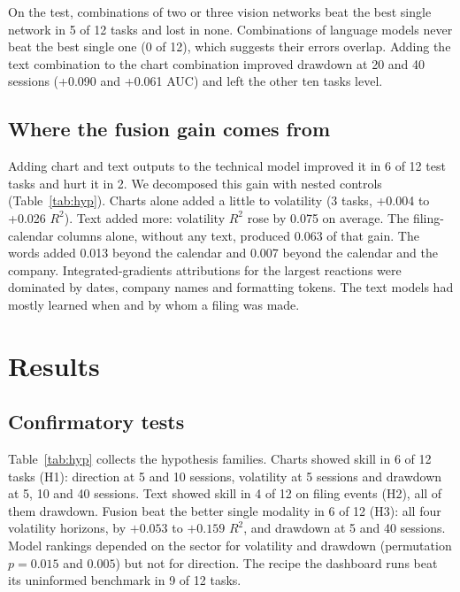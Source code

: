 \documentclass[conference]{IEEEtran}
\begin{document}
On the test, combinations of two or three vision networks beat the best single network in 5 of 12 tasks and lost in none. Combinations of language models never beat the best single one (0 of 12), which suggests their errors overlap. Adding the text combination to the chart combination improved drawdown at 20 and 40 sessions (+0.090 and +0.061 AUC) and left the other ten tasks level.

\subsection{Where the fusion gain comes from}

Adding chart and text outputs to the technical model improved it in 6 of 12 test tasks and hurt it in 2. We decomposed this gain with nested controls (Table~\ref{tab:hyp}). Charts alone added a little to volatility (3 tasks, +0.004 to +0.026 $R^2$). Text added more: volatility $R^2$ rose by 0.075 on average. The filing-calendar columns alone, without any text, produced 0.063 of that gain. The words added 0.013 beyond the calendar and 0.007 beyond the calendar and the company. Integrated-gradients attributions \cite{sundararajan2017} for the largest reactions were dominated by dates, company names and formatting tokens. The text models had mostly learned when and by whom a filing was made.

\section{Results}

\subsection{Confirmatory tests}

Table~\ref{tab:hyp} collects the hypothesis families. Charts showed skill in 6 of 12 tasks (H1): direction at 5 and 10 sessions, volatility at 5 sessions and drawdown at 5, 10 and 40 sessions. Text showed skill in 4 of 12 on filing events (H2), all of them drawdown. Fusion beat the better single modality in 6 of 12 (H3): all four volatility horizons, by $+0.053$ to $+0.159$ $R^2$, and drawdown at 5 and 40 sessions. Model rankings depended on the sector for volatility and drawdown (permutation $p = 0.015$ and $0.005$) but not for direction. The recipe the dashboard runs beat its uninformed benchmark in 9 of 12 tasks.
\end{document}
